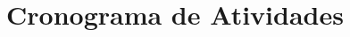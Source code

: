 \documentclass[11pt,oneside,brazil,hidelinks,article,sumario=tradicional,a4paper]{abntex2}
\begin{document}









\section{Cronograma de Atividades}
\end{document}
